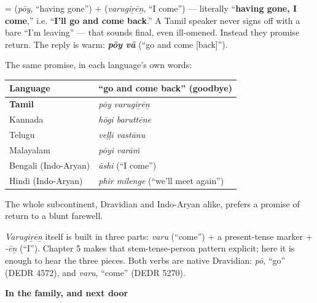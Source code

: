\begin{cousinweb}
\textbf{ } = \textbf{} (\emph{pōy}, \textquotedblleft{}having gone\textquotedblright{}) + \textbf{} (\emph{varugiṟēṉ}, \textquotedblleft{}I come\textquotedblright{}) — literally \textquotedblleft{}\textbf{having gone, I come},\textquotedblright{} i.e. \textquotedblleft{}\textbf{I'll go and come back}.\textquotedblright{} A Tamil speaker never signs off with a bare \textquotedblleft{}I'm leaving\textquotedblright{} — that sounds final, even ill-omened. Instead they promise return. The reply is warm: \emph{\textbf{pōy vā}} (\textquotedblleft{}go and come {[}back{]}\textquotedblright{}).

The same promise, in each language's own words:

\noindent
\begin{tabularx}{\linewidth}{@{}>{\raggedright\arraybackslash}X>{\raggedright\arraybackslash}X@{}}
\toprule
\textbf{Language} & \textbf{\textquotedblleft{}go and come back\textquotedblright{} (goodbye)} \\
\midrule
\textbf{Tamil} & \emph{pōy varugiṟēṉ} \\
Kannada & \emph{hōgi baruttēne} \\
Telugu & \emph{veḷḷi vastānu} \\
Malayalam & \emph{pōyi varāṁ} \\
Bengali (Indo-Aryan) & \emph{āshi} (\textquotedblleft{}I come\textquotedblright{}) \\
Hindi (Indo-Aryan) & \emph{phir milenge} (\textquotedblleft{}we'll meet again\textquotedblright{}) \\
\bottomrule
\end{tabularx}

The whole subcontinent, Dravidian and Indo-Aryan alike, prefers a promise of return to a blunt farewell.

\emph{Varugiṟēṉ} itself is built in three parts: \emph{varu} (\textquotedblleft{}come\textquotedblright{}) + a present-tense marker + \emph{-ēṉ} (\textquotedblleft{}I\textquotedblright{}). Chapter 5 makes that stem-tense-person pattern explicit; here it is enough to hear the three pieces. Both verbs are native Dravidian: \emph{pō}, \textquotedblleft{}go\textquotedblright{} (DEDR 4572), and \emph{varu}, \textquotedblleft{}come\textquotedblright{} (DEDR 5270).

\textbf{In the family, and next door}


\end{cousinweb}
